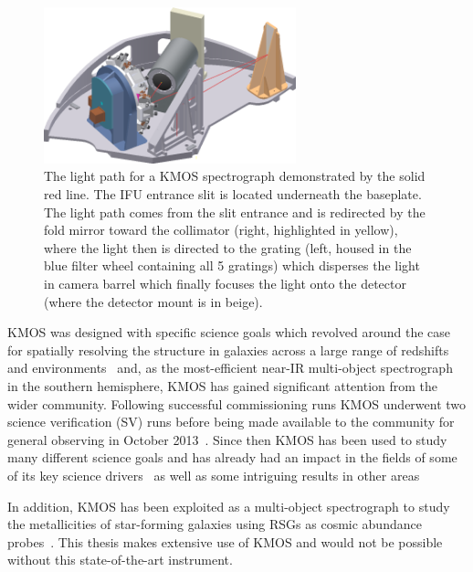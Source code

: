 \begin{figure}
 \centering
 \includegraphics[width=0.65\textwidth]{kmos/kmos-spectrograph}
 \caption[The KMOS light path]{The light path for a KMOS spectrograph demonstrated by the solid red line.
 The IFU entrance slit is located underneath the baseplate.
 The light path comes from the slit entrance and is redirected by the fold mirror toward the collimator (right, highlighted in yellow), where the light then is directed to the grating (left, housed in the blue filter wheel containing all 5 gratings) which disperses the light in camera barrel which finally focuses the light onto the detector (where the detector mount is in beige).
 \label{fig:kmoslight}}
\end{figure}

KMOS was designed with specific science goals which revolved around the case for spatially resolving the structure in galaxies across a large range of redshifts and environments~\citep{2006NewAR..50..370S} and,
as the most-efficient near-IR multi-object spectrograph in the southern hemisphere,
KMOS has gained significant attention from the wider community.
Following successful commissioning runs KMOS underwent two science verification (SV) runs before being made available to the community for general observing in October 2013~\citep{2015IAUS..309...11S}.
Since then KMOS has been used to study many different science goals and has already had an impact in the fields of some of its key science drivers~\citep{2016MNRAS.456.1195H,2016MNRAS.456.4533M} as well as some intriguing results in other areas~\citep{2015A&A...584A...2F,2015MNRAS.453.3875P}

In addition, KMOS has been exploited as a multi-object spectrograph to study the metallicities of star-forming galaxies using RSGs as cosmic abundance probes~\citep{2015ApJ...805..182G,2015ApJ...812..160L,2015ApJ...803...14P}.
This thesis makes extensive use of KMOS and would not be possible without this state-of-the-art instrument.


